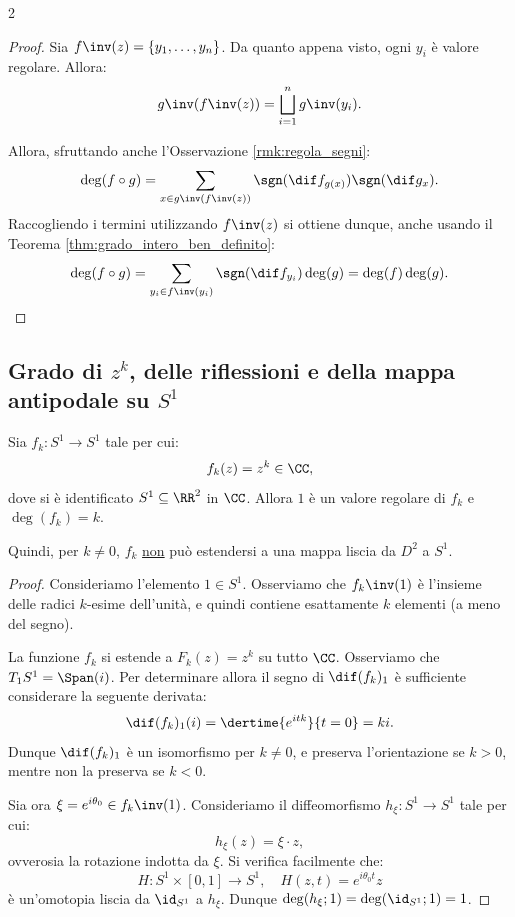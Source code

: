 \begin{multicols*}{2}
\begin{proof}
        Sia $f\inv(z) = \{y_1, \ldots, y_n\}$.
        Da quanto appena visto, ogni $y_i$ è valore regolare.
        Allora:
        \[
            g\inv(f\inv(z)) = \bigsqcup_{i = 1}^n g\inv(y_i).
        \]

        Allora, sfruttando anche l'Osservazione \ref{rmk:regola_segni}:
        \[
            \deg(f \circ g) = \sum_{x \in g\inv(f\inv(z))} \sgn(\dif f_{g(x)}) \sgn(\dif g_x).
        \]
        Raccogliendo i termini utilizzando $f\inv(z)$ si ottiene dunque, anche usando il Teorema \ref{thm:grado_intero_ben_definito}:
        \[
            \deg(f \circ g) = \sum_{y_i \in f\inv(y_i)} \sgn(\dif f_{y_i}) \deg(g) = \deg(f) \deg(g).
        \]
    \end{proof}

    \subsection{Grado di \texorpdfstring{$z^k$}{zᵏ}, delle riflessioni e della mappa antipodale su \texorpdfstring{$S^1$}{S¹}}

    \begin{lemma} \label{lem:grado_zk}
        Sia $f_k : S^1 \to S^1$ tale per cui:
        \[
            f_k(z) = z^k \in \CC,
        \]
        dove si è identificato $S^1 \subseteq \RR^2$ in $\CC$.
        Allora $1$ è un valore regolare di $f_k$ e $\deg(f_k) = k$. \smallskip

        Quindi, per $k \neq 0$, $f_k$ \underline{non} può estendersi a una mappa
        liscia da $D^2$ a $S^1$.
    \end{lemma}

    \begin{proof}
        Consideriamo l'elemento $1 \in S^1$. Osserviamo che
        $f_k\inv(1)$ è l'insieme delle radici $k$-esime dell'unità,
        e quindi contiene esattamente $k$ elementi (a meno del segno). \smallskip

        La funzione $f_k$ si estende a $F_k(z) = z^k$ su tutto $\CC$. Osserviamo
        che $T_1 S^1 = \Span(i)$. Per determinare allora il segno di $\dif (f_k)_1$ è
        sufficiente considerare la seguente derivata:
        \[
            \dif (f_k)_1 (i) = \dertime{e^{i t k}}{t=0} = k i.
        \]
        Dunque $\dif (f_k)_1$ è un isomorfismo per $k \neq 0$, e preserva l'orientazione
        se $k > 0$, mentre non la preserva se $k < 0$. \smallskip

        Sia ora $\xi = e^{i \theta_0} \in f_k\inv(1)$. Consideriamo il diffeomorfismo $h_\xi : S^1 \to S^1$ tale
        per cui:
        \[
            h_\xi(z) = \xi \cdot z,
        \]
        ovverosia la rotazione indotta da $\xi$. Si verifica facilmente che:
        \[
            H : S^1 \times [0, 1] \to S^1, \quad H(z, t) = e^{i \theta_0 t} z
        \]
        è un'omotopia liscia da $\id_{S^1}$ a $h_\xi$. Dunque $\deg(h_\xi; 1) = \deg(\id_{S^1}; 1) = 1$. \smallskip


\end{proof}
\end{multicols*}
